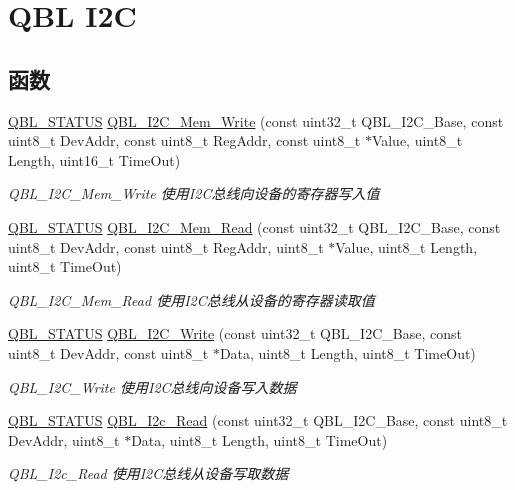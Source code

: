 \hypertarget{group__qbl__i2c}{}\section{Q\+BL I2C}
\label{group__qbl__i2c}
\subsection*{函数}
\begin{DoxyCompactItemize}
\item 
\hyperlink{group__qbl_ga41526b685f55486191108499fe91c30b}{Q\+B\+L\+\_\+\+S\+T\+A\+T\+US} \hyperlink{group__qbl__i2c_gaa439ed38b89ef802f8d2316822dd5b19}{Q\+B\+L\+\_\+\+I2\+C\+\_\+\+Mem\+\_\+\+Write} (const uint32\+\_\+t Q\+B\+L\+\_\+\+I2\+C\+\_\+\+Base, const uint8\+\_\+t Dev\+Addr, const uint8\+\_\+t Reg\+Addr, const uint8\+\_\+t $\ast$Value, uint8\+\_\+t Length, uint16\+\_\+t Time\+Out)
\begin{DoxyCompactList}\small\item\em Q\+B\+L\+\_\+\+I2\+C\+\_\+\+Mem\+\_\+\+Write 使用\+I2\+C总线向设备的寄存器写入值 \end{DoxyCompactList}\item 
\hyperlink{group__qbl_ga41526b685f55486191108499fe91c30b}{Q\+B\+L\+\_\+\+S\+T\+A\+T\+US} \hyperlink{group__qbl__i2c_ga224642e3f2d1615e0b777704f9c8f222}{Q\+B\+L\+\_\+\+I2\+C\+\_\+\+Mem\+\_\+\+Read} (const uint32\+\_\+t Q\+B\+L\+\_\+\+I2\+C\+\_\+\+Base, const uint8\+\_\+t Dev\+Addr, const uint8\+\_\+t Reg\+Addr, uint8\+\_\+t $\ast$Value, uint8\+\_\+t Length, uint8\+\_\+t Time\+Out)
\begin{DoxyCompactList}\small\item\em Q\+B\+L\+\_\+\+I2\+C\+\_\+\+Mem\+\_\+\+Read 使用\+I2\+C总线从设备的寄存器读取值 \end{DoxyCompactList}\item 
\hyperlink{group__qbl_ga41526b685f55486191108499fe91c30b}{Q\+B\+L\+\_\+\+S\+T\+A\+T\+US} \hyperlink{group__qbl__i2c_gac2156e0a1c570c8aa4e168c1b8e516a8}{Q\+B\+L\+\_\+\+I2\+C\+\_\+\+Write} (const uint32\+\_\+t Q\+B\+L\+\_\+\+I2\+C\+\_\+\+Base, const uint8\+\_\+t Dev\+Addr, const uint8\+\_\+t $\ast$Data, uint8\+\_\+t Length, uint8\+\_\+t Time\+Out)
\begin{DoxyCompactList}\small\item\em Q\+B\+L\+\_\+\+I2\+C\+\_\+\+Write 使用\+I2\+C总线向设备写入数据 \end{DoxyCompactList}\item 
\hyperlink{group__qbl_ga41526b685f55486191108499fe91c30b}{Q\+B\+L\+\_\+\+S\+T\+A\+T\+US} \hyperlink{group__qbl__i2c_ga9e68862c129a8f5af02da85c0b1c2e58}{Q\+B\+L\+\_\+\+I2c\+\_\+\+Read} (const uint32\+\_\+t Q\+B\+L\+\_\+\+I2\+C\+\_\+\+Base, const uint8\+\_\+t Dev\+Addr, uint8\+\_\+t $\ast$Data, uint8\+\_\+t Length, uint8\+\_\+t Time\+Out)
\begin{DoxyCompactList}\small\item\em Q\+B\+L\+\_\+\+I2c\+\_\+\+Read 使用\+I2\+C总线从设备写取数据 \end{DoxyCompactList}\end{DoxyCompactItemize}


